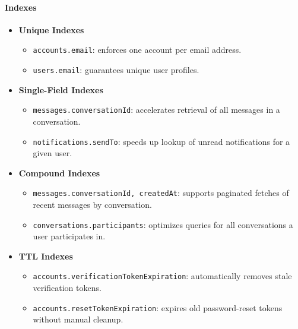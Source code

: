 \paragraph{Indexes}
\begin{itemize}
  \item \textbf{Unique Indexes}
    \begin{itemize}
      \item \texttt{accounts.email}: enforces one account per email address.
      \item \texttt{users.email}: guarantees unique user profiles.
    \end{itemize}

  \item \textbf{Single-Field Indexes}
    \begin{itemize}
      \item \texttt{messages.conversationId}: accelerates retrieval of all messages in a conversation.
      \item \texttt{notifications.sendTo}: speeds up lookup of unread notifications for a given user.
    \end{itemize}

  \item \textbf{Compound Indexes}
    \begin{itemize}
      \item \texttt{messages.{conversationId, createdAt}}: supports paginated fetches of recent messages by conversation.
      \item \texttt{conversations.participants}: optimizes queries for all conversations a user participates in.
    \end{itemize}

  \item \textbf{TTL Indexes}
    \begin{itemize}
      \item \texttt{accounts.verificationTokenExpiration}: automatically removes stale verification tokens.
      \item \texttt{accounts.resetTokenExpiration}: expires old password-reset tokens without manual cleanup.
    \end{itemize}
\end{itemize}


